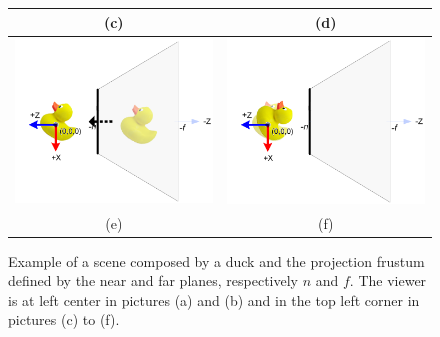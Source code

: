\begin{figure}
\begin{tabular}{|c|c|}
(c)&(d)\\ \hline
\includegraphics[width=0.45\linewidth,keepaspectratio=true]{figs/scene05.png}
&
\includegraphics[width=0.45\linewidth,keepaspectratio=true]{figs/scene06.png}
\\ 
(e)&(f)\\ \hline
\end{tabular}
\caption{Example of a scene composed by a duck and the projection frustum defined by the near and far planes, respectively $n$ and $f$. The viewer is at left center in pictures (a) and (b) and in the top left corner in pictures (c) to (f).}
\label{fig.transformation}
\end{figure}




